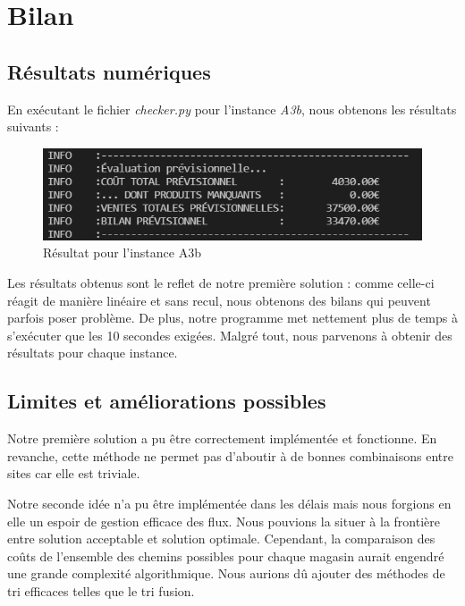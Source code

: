\documentclass[12pt, a4paper]{article}
\begin{document}

\section{Bilan}
\subsection{Résultats numériques}
En exécutant le fichier \emph{checker.py} pour l'instance \emph{A3b}, nous obtenons les résultats suivants :

\begin{figure}[h] %
    \centering
    \includegraphics[width=1\textwidth]{checker} %
    \caption{Résultat pour l'instance A3b} %
    \label{fig:checker} %
\end{figure}

Les résultats obtenus sont le reflet de notre première solution : comme celle-ci réagit de manière linéaire et sans recul, nous obtenons des bilans qui peuvent parfois poser problème. De plus, notre programme met nettement plus de temps à s'exécuter que les 10 secondes exigées. Malgré tout, nous parvenons à obtenir des résultats pour chaque instance.
\subsection{Limites et améliorations possibles}
Notre première solution a pu être correctement implémentée et fonctionne. En revanche, cette méthode ne permet pas d'aboutir à de bonnes combinaisons entre sites car elle est triviale.

Notre seconde idée n'a pu être implémentée dans les délais mais nous forgions en elle un espoir de gestion efficace des flux. Nous pouvions la situer à la frontière entre solution acceptable et solution optimale. Cependant, la comparaison des coûts de l'ensemble des chemins possibles pour chaque magasin aurait engendré une grande complexité algorithmique. Nous aurions dû ajouter des méthodes de tri efficaces telles que le tri fusion.

\end{document}
